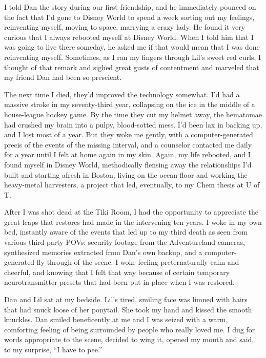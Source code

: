 I told Dan the story during our first friendship, and he
immediately pounced on the fact that I'd gone to Disney World to
spend a week sorting out my feelings, reinventing myself, moving to
space, marrying a crazy lady. He found it very curious that I
always rebooted myself at Disney World. When I told him that I was
going to live there someday, he asked me if that would mean that I
was done reinventing myself. Sometimes, as I ran my fingers through
Lil's sweet red curls, I thought of that remark and sighed great
gusts of contentment and marveled that my friend Dan had been so
prescient.

The next time I died, they'd improved the technology somewhat. I'd
had a massive stroke in my seventy-third year, collapsing on the
ice in the middle of a house-league hockey game. By the time they
cut my helmet away, the hematomae had crushed my brain into a
pulpy, blood-sotted mess. I'd been lax in backing up, and I lost
most of a year. But they woke me gently, with a computer-generated
precis of the events of the missing interval, and a counselor
contacted me daily for a year until I felt at home again in my
skin. Again, my life rebooted, and I found myself in Disney World,
methodically flensing away the relationships I'd built and starting
afresh in Boston, living on the ocean floor and working the
heavy-metal harvesters, a project that led, eventually, to my Chem
thesis at U of T.

After I was shot dead at the Tiki Room, I had the opportunity to
appreciate the great leaps that restores had made in the
intervening ten years. I woke in my own bed, instantly aware of the
events that led up to my third death as seen from various
third-party POVs: security footage from the Adventureland cameras,
synthesized memories extracted from Dan's own backup, and a
computer-generated fly-through of the scene. I woke feeling
preternaturally calm and cheerful, and knowing that I felt that way
because of certain temporary neurotransmitter presets that had been
put in place when I was restored.

Dan and Lil sat at my bedside. Lil's tired, smiling face was limned
with hairs that had snuck loose of her ponytail. She took my hand
and kissed the smooth knuckles. Dan smiled beneficently at me and I
was seized with a warm, comforting feeling of being surrounded by
people who really loved me. I dug for words appropriate to the
scene, decided to wing it, opened my mouth and said, to my
surprise, “I have to pee.”


